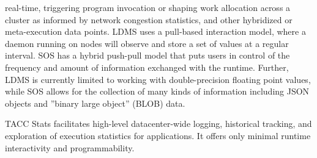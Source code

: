 real-time, triggering program invocation or shaping work allocation
across a cluster as informed by network congestion statistics, and
other hybridized or meta-execution data points.
%
LDMS uses a pull-based interaction model, where a daemon running on
nodes will observe and store a set of values at a regular interval.
%
SOS has a hybrid push-pull model that puts users in control of the
frequency and amount of information exchanged with the runtime.
%
Further, LDMS is currently limited to working with double-precision
floating point values, while SOS allows for the collection of many
kinds of information including JSON objects and ''binary large
object'' (BLOB) data.
%
\par
%
TACC Stats \cite{evans2014comprehensive} facilitates high-level
datacenter-wide logging, historical tracking, and exploration of
execution statistics for applications.  It offers only minimal
runtime interactivity and programmability.
%



